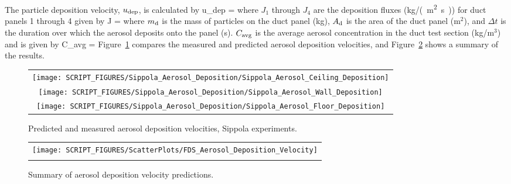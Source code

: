 \noindent The particle deposition velocity, $u_{\rm dep}$, is calculated by
\be
   u_{\rm dep} = 
\ee
where $J_1$ through $J_4$ are the deposition fluxes (\si{kg/(m^2.s)}) for duct panels 1 through 4 given by
\be
   J = 
\ee
where $m_{\rm d}$ is the mass of particles on the duct panel (kg), $A_{\rm d}$ is the area of the duct panel (m$^2$),
and $\Delta t$ is the duration over which the aerosol deposits onto the panel (s). $C_{\rm avg}$ is the
average aerosol concentration in the duct test section (kg/m$^3$) and is given by
\be
   C_{\rm avg} = 
\ee
Figure~\ref{Sippola_Aerosol_Deposition_Velocity} compares the measured and predicted aerosol deposition velocities,
and Figure~\ref{Summary_Aerosol_Deposition_Velocity} shows a summary of the results.

\begin{figure}[!ht]
\begin{center}
\begin{tabular}{c}
\texttt{[image: SCRIPT\_FIGURES/Sippola\_Aerosol\_Deposition/Sippola\_Aerosol\_Ceiling\_Deposition]} \\
\texttt{[image: SCRIPT\_FIGURES/Sippola\_Aerosol\_Deposition/Sippola\_Aerosol\_Wall\_Deposition]} \\
\texttt{[image: SCRIPT\_FIGURES/Sippola\_Aerosol\_Deposition/Sippola\_Aerosol\_Floor\_Deposition]}
\end{tabular}
\end{center}
\caption[Predicted and measured aerosol deposition velocities, Sippola experiments]
{Predicted and measured aerosol deposition velocities, Sippola experiments.}
\label{Sippola_Aerosol_Deposition_Velocity}
\end{figure}

\begin{figure}[!ht]
\begin{center}
\begin{tabular}{c}
\texttt{[image: SCRIPT\_FIGURES/ScatterPlots/FDS\_Aerosol\_Deposition\_Velocity]} \\
\vspace{0.25in} \\
\end{tabular}
\end{center}
\caption[Summary of aerosol deposition velocity predictions]
{Summary of aerosol deposition velocity predictions.}
\label{Summary_Aerosol_Deposition_Velocity}
\end{figure}


